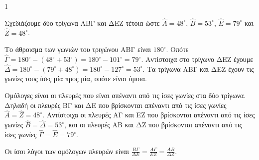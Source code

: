 \begin{ylh}{1}
    \item [Όμοια τρίγωνα]
\end{ylh}
\begin{figure}
\centering
{}
\end{figure}

Σχεδιάζουμε δύο τρίγωνα ΑΒΓ και ΔΕΖ τέτοια ώστε $\hat{A} = 48^\circ$, $\hat{B} = 53^\circ$, $\hat{E} = 79^\circ$ και $\hat{Z} = 48^\circ$.

\begin{alist}
    \item Το άθροισμα των γωνιών του τριγώνου ΑΒΓ είναι $180^\circ$. Οπότε $\hat{\Gamma} = 180^\circ - (48^\circ + 53^\circ) = 180^\circ - 101^\circ = 79^\circ$. Αντίστοιχα στο τρίγωνο ΔΕΖ έχουμε $\hat{\Delta} = 180^\circ - (79^\circ + 48^\circ) = 180^\circ - 127^\circ = 53^\circ$. Τα τρίγωνα ΑΒΓ και ΔΕΖ έχουν τις γωνίες τους ίσες μία προς μία, οπότε είναι όμοια.
    \item
    \begin{rlist}
        \item Ομόλογες είναι οι πλευρές που είναι απέναντι από τις ίσες γωνίες στα δύο τρίγωνα. Δηλαδή οι πλευρές ΒΓ και ΔΕ που βρίσκονται απέναντι από τις ίσες γωνίες $\hat{A} = \hat{Z} = 48^\circ$. Αντίστοιχα οι πλευρές ΑΓ και ΕΖ που βρίσκονται απέναντι από τις ίσες γωνίες $\hat{B} = \hat{\Delta} = 53^\circ$, και οι πλευρές ΑΒ και ΔΖ που βρίσκονται απέναντι από τις ίσες γωνίες $\hat{\Gamma} = \hat{E} = 79^\circ$.
        \item Οι ίσοι λόγοι των ομόλογων πλευρών είναι $\frac{ΒΓ}{ΔΕ} = \frac{ΑΓ}{ΕΖ} = \frac{ΑΒ}{ΔΖ}$.
    \end{rlist}
\end{alist}